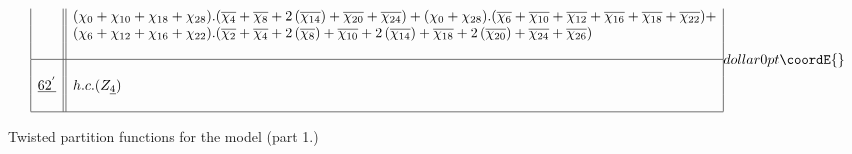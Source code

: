 \documentclass[a4paper,11pt]{article}
\providecommand{\ch}[1]{\chi_{#1}}
\providecommand{\och}[1]{\overline{\chi_{#1}}}
\providecommand{\ud}[1]{\underline{#1}}
\begin{document}
\begin{table}
$${\begin{array}{|c||l|}
{}  & (\ch{0} + \ch{10} + \ch{18} + \ch{28}).(\och{4} + \och{8} +
2\,(\och{14}) + \och{20} + \och{24})
+ (\ch{0} + \ch{28}).(\och{6} + \och{10} + \och{12} + \och{16} +
\och{18} + \och{22}) + \\
{}  & (\ch{6} + \ch{12} + \ch{16} + \ch{22}).(\och{2} + \och{4} +
2\,(\och{8}) +  \och{10} + 2\,(\och{14}) + \och{18} + 2\,(\och{20}) +
\och{24} + \och{26}) \\
{}  & {} \\
\hline
{}  & {} \\
\ud{62^{'}}  & h.c. (Z_{\ud4}) \\
{}  &  {}  \\
\hline
\end{array}
}{dollar}{0pt}\coordE{}$$
\normalsize
\caption{Twisted partition functions for the \coordHE{} model (part 1.)}
\end{table}
\end{document}
